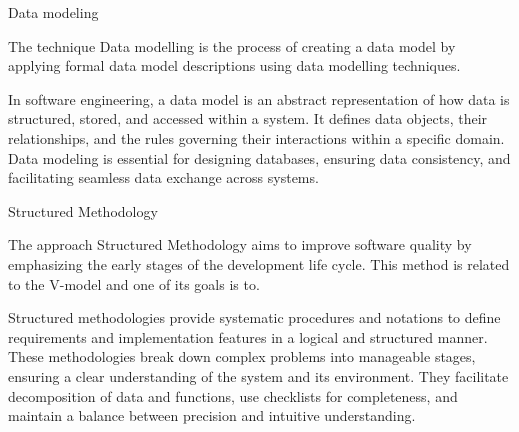 \seccc Data modeling 

The technique {\sbf Data modelling} is the process of creating a data model by applying formal data model descriptions using data modelling techniques.

In software engineering, a data model is an abstract representation of how data is structured, stored, and accessed within a system. It defines data objects, their relationships, and the rules governing their interactions within a specific domain. Data modeling is essential for designing databases, ensuring data consistency, and facilitating seamless data exchange across systems.

\seccc Structured Methodology  

The approach {\sbf Structured Methodology} aims to improve software quality by emphasizing the early stages of the development life cycle. This method is related to the V-model and one of its goals is to.

Structured methodologies provide systematic procedures and notations to define requirements and implementation features in a logical and structured manner. These methodologies break down complex problems into manageable stages, ensuring a clear understanding of the system and its environment. They facilitate decomposition of data and functions, use checklists for completeness, and maintain a balance between precision and intuitive understanding.  

